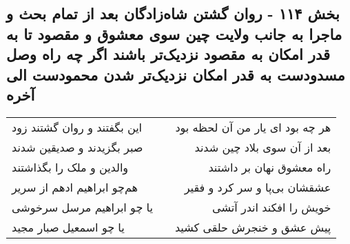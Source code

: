 \begin{center}
\section*{بخش ۱۱۴ - روان گشتن شاه‌زادگان بعد از تمام بحث و ماجرا به جانب ولایت چین سوی معشوق و مقصود تا به قدر امکان به مقصود نزدیک‌تر باشند اگر چه راه وصل  مسدودست به قدر امکان نزدیک‌تر شدن محمودست الی آخره}
\label{sec:sh114}
\begin{longtable}{l p{0.5cm} r}
این بگفتند و روان گشتند زود
&&
هر چه بود ای یار من آن لحظه بود
\\
صبر بگزیدند و صدیقین شدند
&&
بعد از آن سوی بلاد چین شدند
\\
والدین و ملک را بگذاشتند
&&
راه معشوق نهان بر داشتند
\\
هم‌چو ابراهیم ادهم از سریر
&&
عشقشان بی‌پا و سر کرد و فقیر
\\
یا چو ابراهیم مرسل سرخوشی
&&
خویش را افکند اندر آتشی
\\
یا چو اسمعیل صبار مجید
&&
پیش عشق و خنجرش حلقی کشید
\\
\end{longtable}
\end{center}
